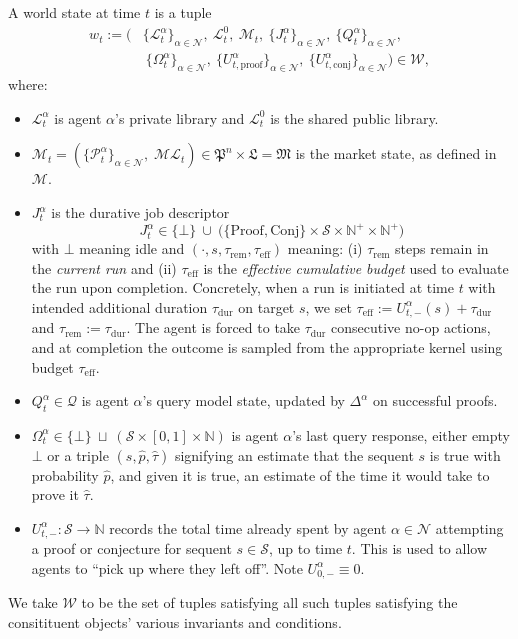 \documentclass[letterpaper]{article} %
\begin{document}
A world state at time $t$ is a tuple
\begin{align*}
w_t :=
\Big(
&\{\mathcal{L}^\alpha_t\}_{\alpha\in\mathcal{N}},
\ \mathcal{L}^0_t,
\ \mathcal{M}_t,
\ \{J^\alpha_t\}_{\alpha\in\mathcal{N}},
\ \{Q^\alpha_t\}_{\alpha\in\mathcal{N}},
\\&\ \{\Omega^\alpha_t\}_{\alpha\in\mathcal{N}},
\ \{U_{t,\mathrm{proof}}^\alpha\}_{\alpha\in\mathcal N},
\ \{U_{t,\mathrm{conj}}^\alpha\}_{\alpha\in\mathcal N}
\Big)\in\mathcal{W},
\end{align*}
where:
\begin{itemize}
\item $\mathcal{L}^\alpha_t$ is agent $\alpha$'s private library and
$\mathcal{L}^0_t$ is the shared public library.
\item $\mathcal{M}_t=(\{\mathcal{P}^\alpha_t\}_{\alpha\in\mathcal{N}},\;\mathcal{ML}_t) \in \mathfrak{P}^n \times \mathfrak{L} =\mathfrak{M}$ is the market state, as defined in $\mathscr{M}$.
\item $J^\alpha_t$ is the durative job descriptor
\[
J^\alpha_t \in \{\bot\}\ \cup\ \big(\{\mathrm{Proof}, \mathrm{Conj}\}\times\mathcal{S}\times\mathbb{N}^+\times\mathbb{N}^+\big)
\]
with $\bot$ meaning idle and $(\cdot,s,\tau_{\mathrm{rem}},\tau_{\mathrm{eff}})$ meaning:
(i) $\tau_{\mathrm{rem}}$ steps remain in the \emph{current run} and
(ii) $\tau_{\mathrm{eff}}$ is the \emph{effective cumulative budget} used to evaluate the run upon completion.
Concretely, when a run is initiated at time $t$ with intended additional duration $\tau_{\mathrm{dur}}$ on target $s$,
we set $\tau_{\mathrm{eff}} := U^\alpha_{t,\mathrm{-}}(s) + \tau_{\mathrm{dur}}$ and $\tau_{\mathrm{rem}} := \tau_{\mathrm{dur}}$.
The agent is forced to take $\tau_{\mathrm{dur}}$ consecutive no-op actions, and at completion the outcome is sampled from the
appropriate kernel using budget $\tau_{\mathrm{eff}}$.
\item $Q^\alpha_t\in\mathcal{Q}$ is agent $\alpha$'s query model state, updated by $\Delta^\alpha$ on successful proofs.
\item  $\Omega^\alpha_t \in \{\bot\}\ \sqcup\ (\mathcal{S}\times[0,1]\times\mathbb{N})$ is agent $\alpha$'s last query response, either empty $\bot$ or a triple $(s,\hat p,\hat \tau)$ signifying an estimate that the sequent $s$ is true with probability $\hat p$, and given it is true, an estimate of the time it would take to prove it $\hat \tau$.
\item $U^\alpha_{t,\mathrm{-}} : \mathcal S \to \mathbb N$ records the total time already spent by agent $\alpha \in \mathcal N$ attempting a proof or conjecture for sequent $s \in \mathcal S$, up to time $t$. This is used to allow agents to ``pick up where they left off''. Note $U^\alpha_{0,\mathrm{-}}\equiv 0$.
\end{itemize}
We take $\mathcal{W}$ to be the set of tuples satisfying all such tuples satisfying the consitituent objects' various invariants and conditions.
\end{document}
